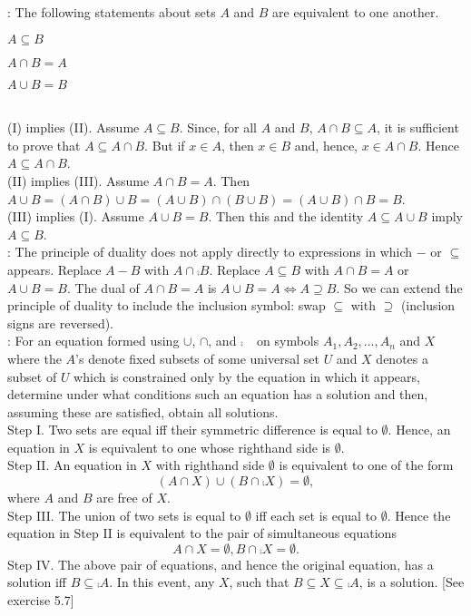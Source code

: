 \documentclass[12pt]{book}
\begin{document}
\renewcommand{\labelenumi}{(\Roman{enumi})}
: The following statements about sets $A$ and $B$ are equivalent to one another.
{\item $A \subseteq B$
\item $A \cap B = A$
\item $A \cup B = B$}

\\
(I) implies (II). Assume $A \subseteq B$. Since, for all $A$ and $B$, $A \cap B \subseteq A$, it is sufficient to prove that $A \subseteq A \cap B$. But if $x \in A$, then $x \in B$ and, hence, $x \in A \cap B$. Hence $A \subseteq A \cap B$.\\
(II) implies (III). Assume $A \cap B = A$. Then $A \cup B = (A \cap B) \cup B = (A \cup B) \cap (B \cup B) = (A \cup B) \cap B = B$.\\
(III) implies (I). Assume $A \cup B = B$. Then this and the identity $A \subseteq A \cup B$ imply $A \subseteq B$.\\

: The principle of duality does not apply directly to expressions in which $-$ or $\subseteq$ appears. Replace $A - B$ with $A \cap \comp{B}$. Replace $A \subseteq B$ with $A \cap B = A$ or $A \cup B = B$. The dual of $A \cap B = A$ is $A \cup B = A \Leftrightarrow A \supseteq B$. So we can extend the principle of duality to include the inclusion symbol: swap $\subseteq$ with $\supseteq$ (inclusion signs are reversed).\\

: For an equation formed using $\cup$, $\cap$, and $\comp{\phantom{A}}$ on symbols $A_1, A_2, \dots, A_n$ and $X$ where the $A$'s denote fixed subsets of some universal set $U$ and $X$ denotes a subset of $U$ which is constrained only by the equation in which it appears, determine under what conditions such an equation has a solution and then, assuming these are satisfied, obtain all solutions.\\
Step I. Two sets are equal iff their symmetric difference is equal to $\emptyset$. Hence, an equation in $X$ is equivalent to one whose righthand side is $\emptyset$.\\
Step II. An equation in $X$ with righthand side $\emptyset$ is equivalent to one of the form $$(A \cap X) \cup (B \cap \comp{X}) = \emptyset,$$ where $A$ and $B$ are free of $X$.\\
Step III. The union of two sets is equal to $\emptyset$ iff each set is equal to $\emptyset$. Hence the equation in Step II is equivalent to the pair of simultaneous equations $$A \cap X = \emptyset, B \cap \comp{X} = \emptyset.$$
Step IV. The above pair of equations, and hence the original equation, has a solution iff $B \subseteq \comp{A}$. In this event, any $X$, such that $B \subseteq X \subseteq \comp{A}$, is a solution. [See exercise 5.7]
\end{document}
